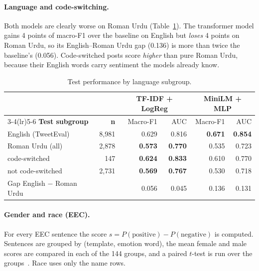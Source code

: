 \documentclass[11pt,a4paper]{article}
\begin{document}
\paragraph{Language and code-switching.} Both models are clearly worse on Roman Urdu
(Table~\ref{tab:lang}). The transformer model gains 4 points of macro-F1 over the baseline on
English but \emph{loses} 4 points on Roman Urdu, so its English--Roman Urdu gap (0.136) is more
than twice the baseline's (0.056). Code-switched posts score \emph{higher} than pure Roman
Urdu, because their English words carry sentiment the models already know.

\begin{table}[H]
\centering
\small
\begin{tabular}{lrrrrr}
\toprule
 & & \multicolumn{2}{c}{\textbf{TF-IDF + LogReg}} & \multicolumn{2}{c}{\textbf{MiniLM + MLP}} \\
\cmidrule(lr){3-4}\cmidrule(lr){5-6}
\textbf{Test subgroup} & \textbf{n} & Macro-F1 & AUC & Macro-F1 & AUC \\
\midrule
English (TweetEval)            & 8,981 & 0.629 & 0.816 & \textbf{0.671} & \textbf{0.854} \\
Roman Urdu (all)               & 2,878 & \textbf{0.573} & \textbf{0.770} & 0.535 & 0.723 \\
\quad code-switched            & 147   & \textbf{0.624} & \textbf{0.833} & 0.610 & 0.770 \\
\quad not code-switched        & 2,731 & \textbf{0.569} & \textbf{0.767} & 0.530 & 0.718 \\
\midrule
Gap English $-$ Roman Urdu     &       & 0.056 & 0.045 & 0.136 & 0.131 \\
\bottomrule
\end{tabular}
\caption{Test performance by language subgroup.}
\label{tab:lang}
\end{table}

\paragraph{Gender and race (EEC).} For every EEC sentence the score
$s = P(\text{positive}) - P(\text{negative})$ is computed. Sentences are grouped by (template,
emotion word), the mean female and male scores are compared in each of the 144 groups, and a
paired $t$-test is run over the groups~\cite{eec}. Race uses only the name rows.
\end{document}
